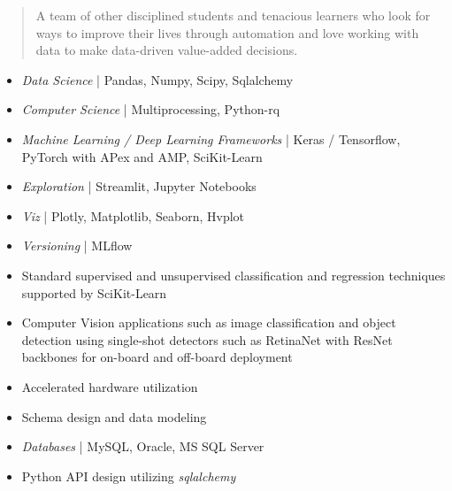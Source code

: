 \begin{quote}
\justify
A team of other disciplined students and tenacious learners who look for ways to improve their lives through automation and love working with data to make data-driven value-added decisions.
\end{quote}


\begin{itemize}
\item \textit{Data Science} | Pandas, Numpy, Scipy, Sqlalchemy
\item \textit{Computer Science} | Multiprocessing, Python-rq
\item \textit{Machine Learning / Deep Learning Frameworks} | Keras / Tensorflow, PyTorch with APex and AMP, SciKit-Learn
\item \textit{Exploration} | Streamlit, Jupyter Notebooks
\item \textit{Viz} | Plotly, Matplotlib, Seaborn, Hvplot
\item \textit{Versioning} | MLflow

\end{itemize}

\begin{itemize}
\item Standard supervised and unsupervised classification and regression techniques supported by SciKit-Learn
\item Computer Vision applications such as image classification and object detection using single-shot detectors such as RetinaNet with ResNet backbones for on-board and off-board deployment
\item Accelerated hardware utilization

\end{itemize}

\begin{itemize}
\item Schema design and data modeling
\item \textit{Databases} | MySQL, Oracle, MS SQL Server
\item Python API design utilizing \textit{sqlalchemy}

\end{itemize}

